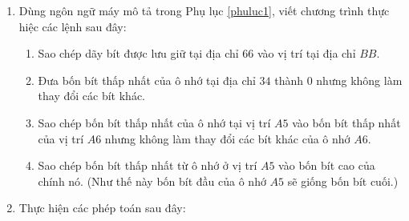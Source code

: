 \begin{multicols}{2}
\begin{enumerate}
  \item Dùng ngôn ngữ máy mô tả trong Phụ lục \ref{phuluc1}, viết chương trình thực hiệc
    các lệnh sau đây:

    \begin{enumerate}
    \item Sao chép dãy bít được lưu giữ tại địa chỉ $66$ vào vị trí tại địa chỉ $BB$.

    \item Đưa bốn bít thấp nhất của ô nhớ tại địa chỉ $34$ thành $0$ nhưng không làm thay
      đổi các bít khác.


    \item Sao chép bốn bít thấp nhất của ô nhớ tại vị trí $A5$ vào bốn bít thấp nhất của
      vị trí $A6$ nhưng không làm thay đổi các bít khác của ô nhớ $A6$.


    \item Sao chép bốn bít thấp nhất từ ô nhớ ở vị trí $A5$ vào bốn bít cao của chính nó.
      (Như thế này bốn bít đầu của ô nhớ $A5$ sẽ giống bốn bít cuối.)
    \end{enumerate}


  \item Thực hiện các phép toán sau đây:

\end{enumerate}
\end{multicols}
